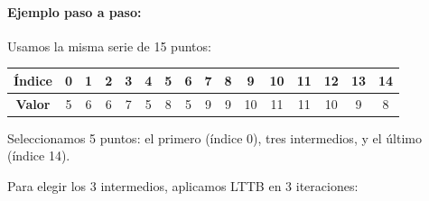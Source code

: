 \paragraph{Ejemplo paso a paso:}

Usamos la misma serie de 15 puntos:

\begin{center}
\begin{tabular}{|c|c|c|c|c|c|c|c|c|c|c|c|c|c|c|c|}
\hline
\textbf{Índice} & 0 & 1 & 2 & 3 & 4 & 5 & 6 & 7 & 8 & 9 & 10 & 11 & 12 & 13 & 14 \\
\hline
\textbf{Valor} & 5 & 6 & 6 & 7 & 5 & 8 & 5 & 9 & 9 & 10 & 11 & 11 & 10 & 9 & 8 \\
\hline
\end{tabular}
\end{center}

Seleccionamos 5 puntos: el primero (índice 0), tres intermedios, y el último (índice 14).

Para elegir los 3 intermedios, aplicamos LTTB en 3 iteraciones:

